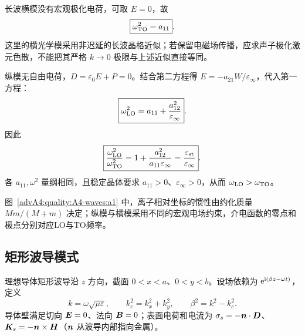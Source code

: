 \begin{advsolution}
长波横模没有宏观极化电荷，可取 $E=0$，故
\[
 \boxed{\omega_{\rm TO}^2=a_{11}}.
\]
这里的横光学模采用非迟延的长波晶格近似；若保留电磁场传播，应求声子极化激元色散，不能把其严格 $k\to0$ 极限与上述近似直接等同。

纵模无自由电荷，$D=\varepsilon_0E+P=0$。结合第二方程得
$E=-a_{21}W/\varepsilon_\infty$，代入第一方程：
\[
 \boxed{\omega_{\rm LO}^2=a_{11}+\frac{a_{12}^2}{\varepsilon_\infty}}.
\]
因此
\[
 \boxed{\frac{\omega_{\rm LO}^2}{\omega_{\rm TO}^2}
 =1+\frac{a_{12}^2}{a_{11}\varepsilon_\infty}
 =\frac{\varepsilon_{\rm st}}{\varepsilon_\infty}}.
\]
各 $a_{11},\omega^2$ 量纲相同，且稳定晶体要求
$a_{11}>0$、$\varepsilon_\infty>0$，从而
$\omega_{\rm LO}>\omega_{\rm TO}$。

图~\ref{advA4:quality:A4-waves:a1} 中，离子相对坐标的惯性由约化质量 $Mm/(M+m)$ 决定；纵模与横模采用不同的宏观电场约束，介电函数的零点和极点分别对应LO与TO频率。
\end{advsolution}

\subsection{矩形波导模式}

理想导体矩形波导沿 $z$ 方向，截面 $0<x<a$、$0<y<b$。设场依赖为
$\mathrm e^{\mathrm i(\beta z-\omega t)}$，定义
\[
 k=\omega\sqrt{\mu\varepsilon},
 \qquad k_c^2=k_x^2+k_y^2,
 \qquad \beta^2=k^2-k_c^2.
\]
导体壁满足切向 $\bm{E}=0$、法向 $\bm{B}=0$；表面电荷和电流为
$\sigma_s=-\bm{n}\cdot\bm{D}$、
$\bm{K}_s=-\bm{n}\times\bm{H}$（$\bm{n}$ 从波导内部指向金属）。

